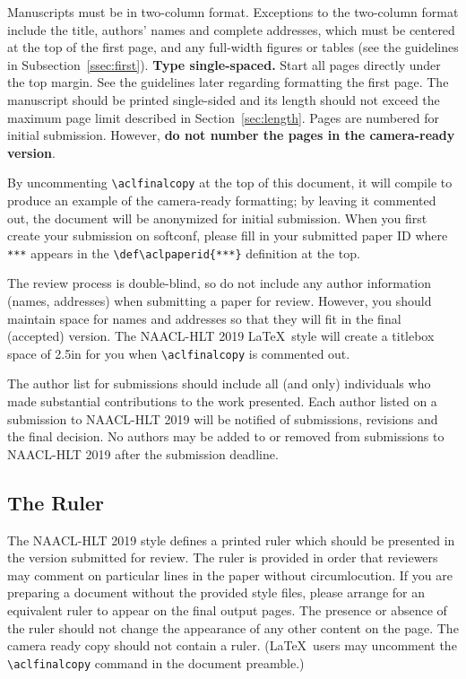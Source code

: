 \documentclass[11pt,a4paper]{article}
\begin{document}
Manuscripts must be in two-column format.  Exceptions to the
two-column format include the title, authors' names and complete
addresses, which must be centered at the top of the first page, and
any full-width figures or tables (see the guidelines in
Subsection~\ref{ssec:first}). {\bf Type single-spaced.}  Start all
pages directly under the top margin. See the guidelines later
regarding formatting the first page.  The manuscript should be
printed single-sided and its length
should not exceed the maximum page limit described in Section~\ref{sec:length}.
Pages are numbered for  initial submission. However, {\bf do not number the pages in the camera-ready version}.

By uncommenting {\small\verb|\aclfinalcopy|} at the top of this 
 document, it will compile to produce an example of the camera-ready formatting; by leaving it commented out, the document will be anonymized for initial submission.  When you first create your submission on softconf, please fill in your submitted paper ID where {\small\verb|***|} appears in the {\small\verb|\def\aclpaperid{***}|} definition at the top.

The review process is double-blind, so do not include any author information (names, addresses) when submitting a paper for review.  
However, you should maintain space for names and addresses so that they will fit in the final (accepted) version.  The NAACL-HLT 2019 \LaTeX\ style will create a titlebox space of 2.5in for you when {\small\verb|\aclfinalcopy|} is commented out.  

The author list for submissions should include all (and only) individuals who made substantial contributions to the work presented. Each author listed on a submission to NAACL-HLT 2019 will be notified of submissions, revisions and the final decision. No authors may be added to or removed from submissions to NAACL-HLT 2019 after the submission deadline.

\subsection{The Ruler}
The NAACL-HLT 2019 style defines a printed ruler which should be presented in the
version submitted for review.  The ruler is provided in order that
reviewers may comment on particular lines in the paper without
circumlocution.  If you are preparing a document without the provided
style files, please arrange for an equivalent ruler to
appear on the final output pages.  The presence or absence of the ruler
should not change the appearance of any other content on the page.  The
camera ready copy should not contain a ruler. (\LaTeX\ users may uncomment the {\small\verb|\aclfinalcopy|} command in the document preamble.)  
\end{document}
